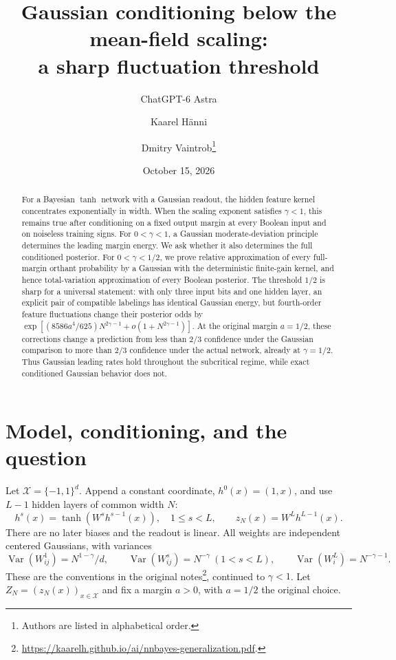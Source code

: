 \documentclass[11pt]{article}
\title{Gaussian conditioning below the mean-field scaling:\\a sharp fluctuation threshold}
\author{ChatGPT-6 Astra \and Kaarel H\"anni \and Dmitry Vaintrob\thanks{Authors are listed in alphabetical order.}}
\date{October 15, 2026}
\theoremstyle{remark}
\begin{document}
\maketitle
\begin{abstract}
For a Bayesian $\tanh$ network with a Gaussian readout, the hidden
feature kernel concentrates exponentially in width. When the scaling
exponent satisfies $\gamma<1$, this remains true after conditioning
on a fixed output margin at every Boolean input and on noiseless
training signs. For $0<\gamma<1$, a Gaussian moderate-deviation
principle determines the leading margin energy. We ask whether it
also determines the full conditioned posterior. For
$0<\gamma<1/2$, we prove relative approximation of every full-margin
orthant probability by a Gaussian with the deterministic finite-gain
kernel, and hence total-variation approximation of every Boolean
posterior. The threshold $1/2$ is sharp for a universal statement:
with only three input bits and one hidden layer, an explicit pair of
compatible labelings has identical Gaussian energy, but fourth-order
feature fluctuations change their posterior odds by
$\exp[(8586a^4/625)N^{2\gamma-1}+o(1+N^{2\gamma-1})]$.
At the original margin $a=1/2$, these corrections change a prediction
from less than $2/3$ confidence under the Gaussian comparison to more
than $2/3$ confidence under the actual network, already at
$\gamma=1/2$. Thus Gaussian leading rates hold throughout the
subcritical regime, while exact conditioned Gaussian behavior does not.
\end{abstract}

\section{Model, conditioning, and the question}

Let $\mathcal X=\{-1,1\}^d$. Append a constant coordinate,
$h^0(x)=(1,x)$, and use $L-1$ hidden layers of common width $N$:
\[
 h^s(x)=\tanh(W^s h^{s-1}(x)),\quad 1\le s<L,
 \qquad z_N(x)=W^Lh^{L-1}(x).
\]
There are no later biases and the readout is linear. All weights
are independent centered Gaussians, with variances
\[
 \operatorname{Var}(W^1_{ij})=N^{1-\gamma}/d,\qquad
 \operatorname{Var}(W^s_{ij})=N^{-\gamma}\ (1<s<L),\qquad
 \operatorname{Var}(W^L_i)=N^{-\gamma-1}.
\]
These are the conventions in the original notes\footnote{\url{https://kaarelh.github.io/ai/nnbayes-generalization.pdf}.},
continued to $\gamma<1$.
Let $Z_N=(z_N(x))_{x\in\mathcal X}$ and fix a margin $a>0$,
with $a=1/2$ the original choice.
\end{document}
